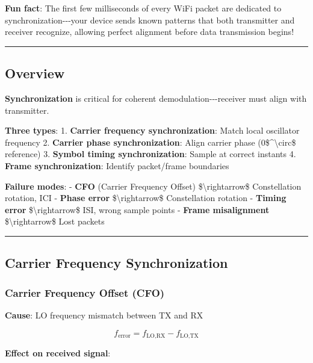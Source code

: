 \textbf{Fun fact}: The first few milliseconds of every WiFi packet are
dedicated to synchronization-\/-\/-your device sends known patterns that
both transmitter and receiver recognize, allowing perfect alignment
before data transmission begins!

\begin{center}\rule{0.5\linewidth}{0.5pt}\end{center}

\subsection{Overview}\label{overview}

\textbf{Synchronization} is critical for coherent
demodulation-\/-\/-receiver must align with transmitter.

\textbf{Three types}: 1. \textbf{Carrier frequency synchronization}:
Match local oscillator frequency 2. \textbf{Carrier phase
synchronization}: Align carrier phase (0\$\^{}\textbackslash circ\$
reference) 3. \textbf{Symbol timing synchronization}: Sample at correct
instants 4. \textbf{Frame synchronization}: Identify packet/frame
boundaries

\textbf{Failure modes}: - \textbf{CFO} (Carrier Frequency Offset)
\$\textbackslash rightarrow\$ Constellation rotation, ICI -
\textbf{Phase error} \$\textbackslash rightarrow\$ Constellation
rotation - \textbf{Timing error} \$\textbackslash rightarrow\$ ISI,
wrong sample points - \textbf{Frame misalignment}
\$\textbackslash rightarrow\$ Lost packets

\begin{center}\rule{0.5\linewidth}{0.5pt}\end{center}

\subsection{Carrier Frequency
Synchronization}\label{carrier-frequency-synchronization}

\subsubsection{Carrier Frequency Offset
(CFO)}\label{carrier-frequency-offset-cfo}

\textbf{Cause}: LO frequency mismatch between TX and RX

\[
f_{\text{error}} = f_{\text{LO,RX}} - f_{\text{LO,TX}}
\]

\textbf{Effect on received signal}:

